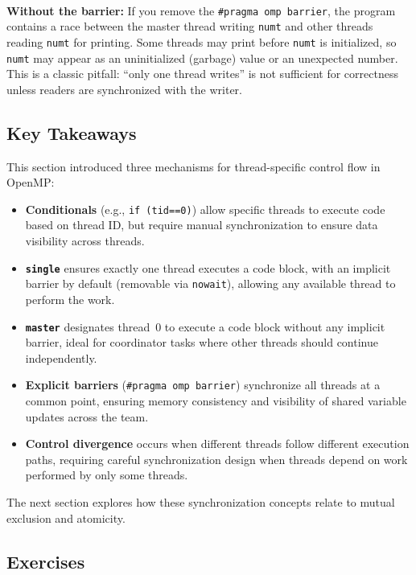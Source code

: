 \begin{pppitfall}
\\\textbf{Without the barrier:} If you remove the \texttt{\#pragma omp barrier}, the program contains a race between the master thread writing \texttt{numt} and other threads reading \texttt{numt} for printing. Some threads may print before \texttt{numt} is initialized, so \texttt{numt} may appear as an uninitialized (garbage) value or an unexpected number. This is a classic pitfall: ``only one thread writes'' is not sufficient for correctness unless readers are synchronized with the writer.
\end{pppitfall}

\subsection{Key Takeaways}

This section introduced three mechanisms for thread-specific control flow in OpenMP:
\begin{itemize}
    \item \textbf{Conditionals} (e.g., \texttt{if (tid==0)}) allow specific threads to execute code based on thread ID, but require manual synchronization to ensure data visibility across threads.
    \item \textbf{\texttt{single}} ensures exactly one thread executes a code block, with an implicit barrier by default (removable via \texttt{nowait}), allowing any available thread to perform the work.
    \item \textbf{\texttt{master}} designates thread~0 to execute a code block without any implicit barrier, ideal for coordinator tasks where other threads should continue independently.
    \item \textbf{Explicit barriers} (\texttt{\#pragma omp barrier}) synchronize all threads at a common point, ensuring memory consistency and visibility of shared variable updates across the team.
    \item \textbf{Control divergence} occurs when different threads follow different execution paths, requiring careful synchronization design when threads depend on work performed by only some threads.
\end{itemize}
The next section explores how these synchronization concepts relate to mutual exclusion and atomicity.

\subsection{Exercises}


